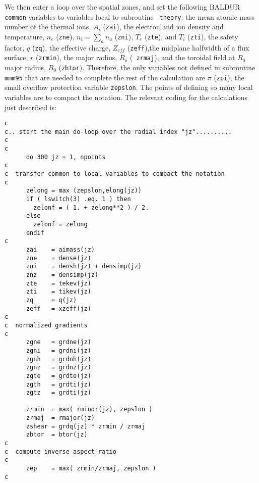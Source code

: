 We then enter a loop over the spatial zones, and set the following
BALDUR {\tt common} variables to variables local to subroutine {\tt
theory}: the mean atomic mass number of the thermal ions, $A_{i}$
({\tt zai}), the electron and ion density and temperature, $n_{e}$
({\tt zne}), $n_{i}=\sum_{a}n_{a}$ ({\tt zni}), $T_{e}$ ({\tt zte}),
and $T_{i}$ ({\tt zti}), the safety factor, $q$ ({\tt zq}), the
effective charge, $Z_{eff}$ ({\tt zeff}),the midplane halfwidth of a
flux surface, $r$ ({\tt zrmin}), the major radius, $R_{o}$ ({\tt
zrmaj}), and the toroidal field at $R_0$ major radius, $B_{0}$
({\tt zbtor}).  Therefore, the only variables not defined in
subroutine {\tt mmm95} that are needed to complete the rest of the
calculation are $\pi$ ({\tt zpi}), the small overflow protection
variable {\tt zepslon}.  The points of defining so many local
variables are to compact the notation.  The relevant coding for the
calculations just described is:

\begin{verbatim}
c
c.. start the main do-loop over the radial index "jz"..........
c
c
      do 300 jz = 1, npoints
c
c  transfer common to local variables to compact the notation
c
      zelong = max (zepslon,elong(jz))
      if ( lswitch(3) .eq. 1 ) then
        zelonf = ( 1. + zelong**2 ) / 2.
      else
        zelonf = zelong
      endif
c
      zai    = aimass(jz)
      zne    = dense(jz)
      zni    = densh(jz) + densimp(jz)
      znz    = densimp(jz)
      zte    = tekev(jz)
      zti    = tikev(jz)
      zq     = q(jz)
      zeff   = xzeff(jz)
c
c  normalized gradients
c
      zgne   = grdne(jz)
      zgni   = grdni(jz)
      zgnh   = grdnh(jz)
      zgnz   = grdnz(jz)
      zgte   = grdte(jz)
      zgth   = grdti(jz)
      zgtz   = grdti(jz)

      zrmin  = max( rminor(jz), zepslon )
      zrmaj  = rmajor(jz)
      zshear = grdq(jz) * zrmin / zrmaj
      zbtor  = btor(jz)
c
c  compute inverse aspect ratio
c
      zep    = max( zrmin/zrmaj, zepslon )
c
\end{verbatim}

